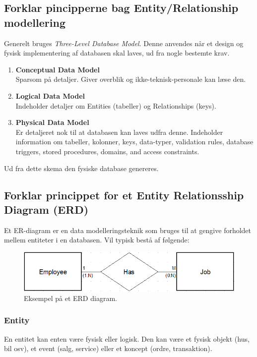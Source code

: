 \newpage

\subsection{Forklar pincipperne bag Entity/Relationship modellering}

Generelt bruges \textit{Three-Level Database Model}. Denne anvendes når et design og fysisk implementering af databasen skal laves, ud fra nogle bestemte krav. 

\begin{enumerate}
	\item \textbf{Conceptual Data Model}\\
	Sparsom på detaljer. Giver overblik og ikke-teknisk-personale kan læse den.
	\item \textbf{Logical Data Model}\\
	Indeholder detaljer om Entities (tabeller) og Relationships (keys).
	\item \textbf{Physical Data Model}\\
	Er detaljeret nok til at databasen kan laves udfra denne. Indeholder information om tabeller, kolonner, keys, data-typer, validation rules, database triggers, stored procedures, domains, and access constraints.
\end{enumerate}

Ud fra dette skema den fysiske database genereres.

\subsection{Forklar princippet for et Entity Relationsship Diagram (ERD)}

Et ER-diagram er en data modelleringsteknik som bruges til at gengive forholdet mellem entiteter i en databasen. Vil typisk bestå af følgende:

\begin{figure}[h]
	\centering
	\includegraphics[width=0.8\linewidth]{figs/spm1/entity_in_relation}
	\caption{Eksempel på et ERD diagram.}
	\label{fig:erd}
\end{figure}

\subsubsection{Entity}
En entitet kan enten være fysisk eller logisk. Den kan være et fysisk objekt  (hus, bil osv), et event (salg, service) eller et koncept (ordre, transaktion).

